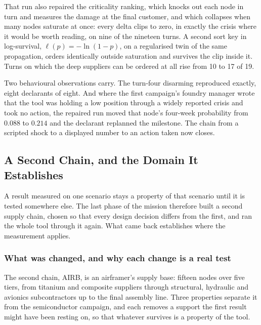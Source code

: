 That run also repaired the criticality ranking, which knocks out each node in turn and measures
the damage at the final customer, and which collapses when many nodes saturate at once: every
delta clips to zero, in exactly the crisis where it would be worth reading, on nine of the
nineteen turns. A second sort key in log-survival, $\ell(p) = -\ln(1-p)$, on a regularised twin
of the same propagation, orders identically outside saturation and survives the clip inside it.
Turns on which the deep suppliers can be ordered at all rise from 10 to 17 of 19.

Two behavioural observations carry. The turn-four disarming reproduced exactly, eight
declarants of eight. And where the first campaign's foundry manager wrote that the tool was
holding a low position through a widely reported crisis and took no action, the repaired run
moved that node's four-week probability from $0.088$ to $0.214$ and the declarant replanned the
milestone. The chain from a scripted shock to a displayed number to an action taken now
closes.

\subsection{A Second Chain, and the Domain It Establishes}
\label{sec:chaine2}

A result measured on one scenario stays a property of that scenario until it is tested
somewhere else. The last phase of the mission therefore built a second supply chain, chosen so
that every design decision differs from the first, and ran the whole tool through it again.
What came back establishes where the measurement applies.

\subsubsection{What was changed, and why each change is a real test}

The second chain, AIRB, is an airframer's supply base: fifteen nodes over five tiers, from
titanium and composite suppliers through structural, hydraulic and avionics subcontractors up
to the final assembly line. Three properties separate it from the semiconductor campaign, and
each removes a support the first result might have been resting on, so that whatever survives
is a property of the tool.


